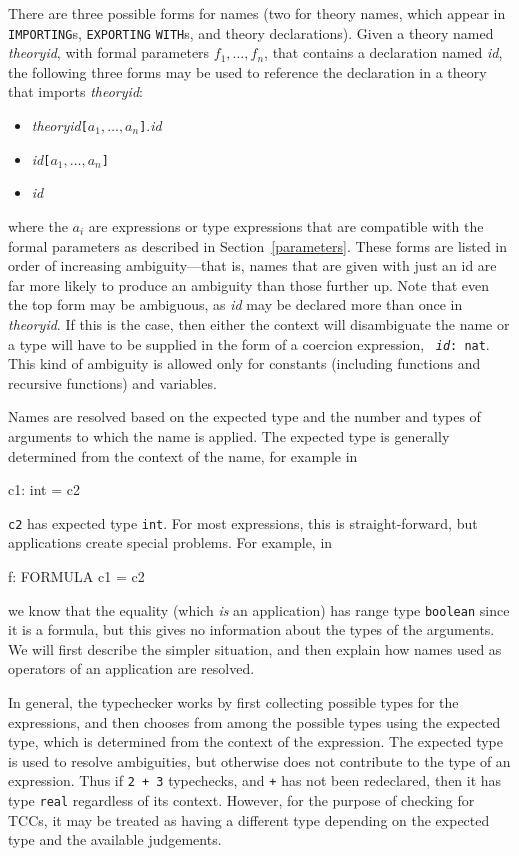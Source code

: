 There are three possible forms for names (two for theory names, which
appear in {\tt IMPORTING}s, {\tt EXPORTING} {\tt WITH}s, and theory
declarations).  Given a theory named {\em theoryid\/}, with formal
parameters $f_1,\ldots,f_n$, that contains a declaration named {\em
id\/}, the following three forms may be used to reference the
declaration in a theory that imports {\em theoryid\/}:
\begin{itemize}
\item {\em theoryid\/}{\tt [$a_1,\ldots,a_n$]}.{\em id\/}

\item {\em id\/}{\tt [$a_1,\ldots,a_n$]}

\item {\em id}

\end{itemize}
where the $a_i$ are expressions or type expressions that are compatible
with the formal parameters as described in Section~\ref{parameters}.
These forms are listed in order of increasing ambiguity---that is, names
that are given with just an id are far more likely to produce an ambiguity
than those further up.  Note that even the top form may be
ambiguous, as {\em id\/} may be declared more than once in {\em theoryid\/}.
If this is the case, then either the context will disambiguate the name or
a type will have to be supplied in the form of a coercion expression, \eg\
{\tt {\em id\/}:~nat}.  This kind of ambiguity is allowed only for
constants (including functions and recursive functions) and variables.

Names are resolved based on the expected type and the number and types of
arguments to which the name is applied.  The expected type is generally
determined from the context of the name, for example in
\begin{pvsex}
  c1: int = c2
\end{pvsex}
\texttt{c2} has expected type \texttt{int}.  For most expressions, this is
straight-forward, but applications create special problems.  For example,
in
\begin{pvsex}
  f: FORMULA c1 = c2
\end{pvsex}
we know that the equality (which \emph{is} an application) has range type
\texttt{boolean} since it is a formula, but this gives no information
about the types of the arguments.  We will first describe the simpler
situation, and then explain how names used as operators of an application
are resolved.

In general, the typechecker works by first collecting possible types for
the expressions, and then chooses from among the possible types using the
expected type, which is determined from the context of the expression.
The expected type is used to resolve ambiguities, but otherwise does not
contribute to the type of an expression.  Thus if \texttt{2 + 3}
typechecks, and \texttt{+} has not been redeclared, then it has type
\texttt{real} regardless of its context.  However, for the purpose of
checking for TCCs, it may be treated as having a different type depending
on the expected type and the available judgements.

